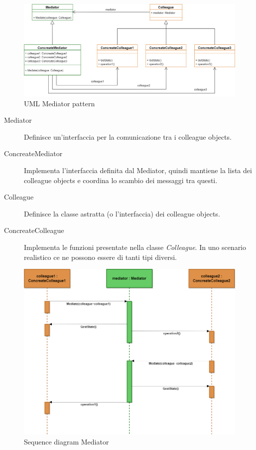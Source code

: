 \documentclass{article}
\begin{document}
\begin{sloppy}
\bigbreak
\bigbreak

\begin{figure}[H]
    \centering
    \includegraphics[scale=0.32]{figure5.png}
    \caption{UML Mediator pattern}
    \label{fig:enter-label}
\end{figure}

\bigbreak

\begin{description}
    \item[Mediator]Definisce un'interfaccia per la comunicazione tra i colleague objects.
    \item[ConcreateMediator]Implementa l'interfaccia definita dal Mediator, quindi mantiene la lista dei colleague objects e coordina lo scambio dei messaggi tra questi.
    \item[Colleague]Definisce la classe astratta (o l'interfaccia) dei colleague objects.
    \item[ConcreateColleague]Implementa le funzioni presentate nella classe \textit{Colleague}. In uno scenario realistico ce ne possono essere di tanti tipi diversi.
\end{description}

\bigbreak


\begin{figure}[H]
    \centering
    \includegraphics[scale=0.37]{figure6.png}
    \caption{Sequence diagram Mediator}
    \label{fig:enter-label}
\end{figure}


\end{sloppy}
\end{document}
